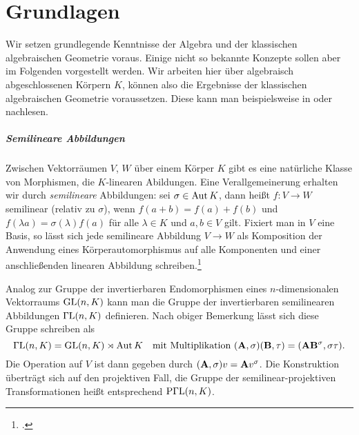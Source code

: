 \chapter{Grundlagen} \label{chap:prelim}
Wir setzen grundlegende Kenntnisse der Algebra und der klassischen algebraischen Geometrie voraus. Einige nicht so bekannte Konzepte sollen aber im Folgenden vorgestellt werden. Wir arbeiten hier über algebraisch abgeschlossenen Körpern $K$, können also die Ergebnisse der klassischen algebraischen Geometrie voraussetzen. Diese kann man beispielsweise in \cite{Shafarevich} oder \cite{Mumford} nachlesen.

\paragraph{Semilineare Abbildungen} Zwischen Vektorräumen $V$, $W$ über einem Körper $K$ gibt es eine natürliche Klasse von Morphismen, die $K$-linearen Abildungen. Eine Verallgemeinerung erhalten wir durch \emph{semilineare} Abbildungen: sei $\sigma \in \operatorname{Aut} K$, dann heißt $f: V \to W$ semilinear (relativ zu $\sigma$), wenn $f(a+b) = f(a) + f(b)$ und $f(\lambda a) = \sigma(\lambda)f(a)$ für alle $\lambda \in K$ und $a, b \in V$ gilt. Fixiert man in $V$ eine Basis, so lässt sich jede semilineare Abbildung $V \to W$ als Komposition der Anwendung eines Körperautomorphismus auf alle Komponenten und einer anschließenden linearen Abbildung schreiben.\footcite[Das folgt leicht aus den Bemerkungen in][S.~2--3]{Dieudonne}

Analog zur Gruppe der invertierbaren Endomorphismen eines $n$-dimensionalen Vektorraums $\mathrm{GL}(n,K)$ kann man die Gruppe der invertierbaren semilinearen Abbildungen $\mathrm{\Gamma L}(n,K)$ definieren. Nach obiger Bemerkung lässt sich diese Gruppe schreiben als
\begin{equation}
\mathrm{\Gamma L}(n,K) = \mathrm{GL}(n,K) \rtimes \operatorname{Aut} K \quad\text{mit Multiplikation } (\mathbf{A}, \sigma)(\mathbf{B}, \tau) = (\mathbf{A} \mathbf{B}^\sigma, \sigma \tau).
\end{equation}
Die Operation auf $V$ ist dann gegeben durch $(\mathbf{A}, \sigma)v = \mathbf{A} v^\sigma$. Die Konstruktion überträgt sich auf den projektiven Fall, die Gruppe der semilinear-projektiven Transformationen heißt entsprechend $\mathrm{P\Gamma L}(n,K)$.

